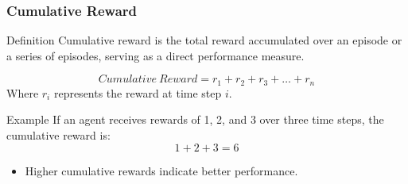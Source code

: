 \documentclass[aspectratio=169]{beamer}
\begin{document}
\begin{frame}[fragile]
    \frametitle{Cumulative Reward}
    \begin{block}{Definition}
        Cumulative reward is the total reward accumulated over an episode or a series of episodes, serving as a direct performance measure.
    \end{block}
    
    \begin{equation}
        Cumulative\ Reward = r_1 + r_2 + r_3 + \ldots + r_n
    \end{equation}
    Where \(r_i\) represents the reward at time step \(i\).

    \begin{exampleblock}{Example}
        If an agent receives rewards of 1, 2, and 3 over three time steps, the cumulative reward is:
        \[
        1 + 2 + 3 = 6
        \]
    \end{exampleblock}

    \begin{itemize}
        \item Higher cumulative rewards indicate better performance.
    \end{itemize}
\end{frame}
\end{document}
